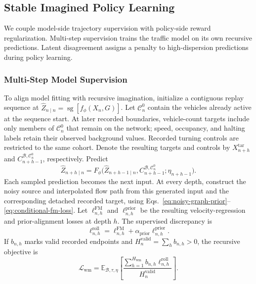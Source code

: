 \subsection{Stable Imagined Policy Learning}
\label{sec:stable-imagination}

We couple model-side trajectory supervision with policy-side reward
regularization. Multi-step supervision trains the traffic model on its own
recursive predictions. Latent disagreement assigns a penalty to
high-dispersion predictions during policy learning.

\subsubsection{Multi-Step Model Supervision}

To align model fitting with recursive imagination, initialize a contiguous
replay sequence at
$\widehat Z_{n\mid n}=\operatorname{sg}[f_\phi(X_n,G)]$.
Let $\mathcal C_n^0$ contain the vehicles already active at the sequence
start. At later recorded boundaries, vehicle-count targets include only
members of $\mathcal C_n^0$ that remain on the network; speed, occupancy,
and halting labels retain their observed background values. Recorded
turning controls are restricted to the same cohort. Denote the resulting
targets and controls by $X_{n+h}^{\mathrm{tar}}$ and
$C_{n+h-1}^{\mathcal B,\mathcal C_n^0}$, respectively. Predict
\begin{equation}
 \widehat Z_{n+h\mid n}
   =F_\phi\bigl(\widehat Z_{n+h-1\mid n},
          C_{n+h-1}^{\mathcal B,\mathcal C_n^0};\eta_{n+h-1}\bigr).
 \label{eq:multistep-model-rollout}
\end{equation}
Each sampled prediction becomes the next input. At every depth, construct
the noisy source and interpolated flow path from this generated input
and the corresponding detached recorded target, using
Eqs.~\eqref{eq:noisy-graph-prior}--\eqref{eq:conditional-fm-loss}.
Let $\ell_{n,h}^{\mathrm{FM}}$ and
$\ell_{n,h}^{\mathrm{prior}}$ be the resulting velocity-regression and
prior-alignment losses at depth $h$. The supervised discrepancy is
\begin{equation}
 \ell_{n,h}^{\mathrm{roll}}
   =\ell_{n,h}^{\mathrm{FM}}
       +\alpha_{\mathrm{prior}}\ell_{n,h}^{\mathrm{prior}}.
 \label{eq:explicit-rollout-discrepancy}
\end{equation}
If $b_{n,h}$ marks valid recorded endpoints and
$H_n^{\mathrm{valid}}=\sum_h b_{n,h}>0$, the recursive objective is
\begin{equation}
 \mathcal L_{\mathrm{wm}}
   =\mathbb E_{\mathcal B,\tau,\eta}\!\left[
       \frac{\sum_{h=1}^{H_{\mathrm{wm}}}
                       b_{n,h}\ell_{n,h}^{\mathrm{roll}}}
            {H_n^{\mathrm{valid}}}
      \right].
 \label{eq:full-world-model-loss}
\end{equation}
